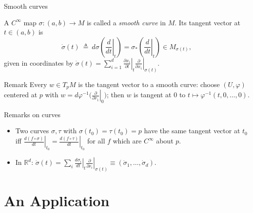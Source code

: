 \documentclass[10pt]{beamer}
\newcommand{\R}{\mathbb{R}}
\begin{document}
\begin{frame}{Smooth curves}
	\begin{definition}
		A $C^\infty$ map $\sigma : (a, b) \to M$ is called a \emph{smooth
			curve} in $M$. Its tangent vector at $t \in (a,b)$ is
		\[
			\dot{\sigma}(t) \ \triangleq\
			d\sigma\left( \left. \frac{d}{dt} \right|_{t} \right)
			= \sigma_*\left( \left. \frac{d}{dt} \right|_{t} \right)
			\in M_{\sigma(t)},
		\]
		given in coordinates by
		$\dot{\sigma}(t) = \sum_{i=1}^{d} \left. \frac{\partial x_i}{\partial t} \right|_{t} \left. \frac{\partial}{\partial x_i} \right|_{\sigma(t)}$.
	\end{definition}
	\begin{block}{Remark}
		Every $w \in T_p M$ is the tangent vector to a smooth curve: choose
		$(U, \varphi)$ centered at $p$ with
		$w = d\varphi^{-1}\bigl( \left. \frac{\partial}{\partial r_1}
			\right|_{0} \bigr)$; then $w$ is tangent at $0$ to
		$t \mapsto \varphi^{-1}(t, 0, \dots, 0)$.
	\end{block}
\end{frame}

\begin{frame}{Remarks on curves}
	\begin{itemize}
		\item Two curves $\sigma, \tau$ with $\sigma(t_0) = \tau(t_0) = p$
		      have the same tangent vector at $t_0$ iff
		      $\left. \frac{d(f \circ \sigma)}{dt} \right|_{t_0}
			      = \left. \frac{d(f \circ \tau)}{dt} \right|_{t_0}$ for all
		      $f$ which are $C^\infty$ about $p$.
		\item In $\R^d$:\quad
		      $\dot{\sigma}(t) = \sum_i \left. \frac{d\sigma_i}{dt}
			      \right|_{t} \left. \frac{\partial}{\partial r_i}
			      \right|_{\sigma(t)} \equiv (\dot{\sigma}_1, \dots,
			      \dot{\sigma}_d)$.
	\end{itemize}
\end{frame}

\section{An Application}
\end{document}
